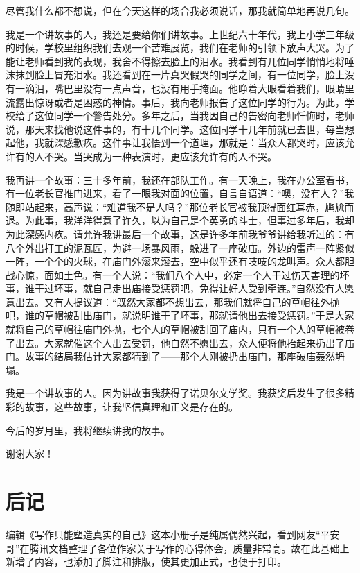 \documentclass[12pt,a5paper]{ctexbook}
\begin{document}
尽管我什么都不想说，但在今天这样的场合我必须说话，那我就简单地再说几句。

我是一个讲故事的人，我还是要给你们讲故事。上世纪六十年代，我上小学三年级的时候，学校里组织我们去观一个苦难展览，我们在老师的引领下放声大哭。为了能让老师看到我的表现，我舍不得擦去脸上的泪水。我看到有几位同学悄悄地将唾沫抹到脸上冒充泪水。我还看到在一片真哭假哭的同学之间，有一位同学，脸上没有一滴泪，嘴巴里没有一点声音，也没有用手掩面。他睁着大眼看着我们，眼睛里流露出惊讶或者是困惑的神情。事后，我向老师报告了这位同学的行为。为此，学校给了这位同学一个警告处分。多年之后，当我因自己的告密向老师忏悔时，老师说，那天来找他说这件事的，有十几个同学。这位同学十几年前就已去世，每当想起他，我就深感歉疚。这件事让我悟到一个道理，那就是：当众人都哭时，应该允许有的人不哭。当哭成为一种表演时，更应该允许有的人不哭。

我再讲一个故事：三十多年前，我还在部队工作。有一天晚上，我在办公室看书，有一位老长官推门进来，看了一眼我对面的位置，自言自语道：“噢，没有人？”我随即站起来，高声说：“难道我不是人吗？”那位老长官被我顶得面红耳赤，尴尬而退。为此事，我洋洋得意了许久，以为自己是个英勇的斗士，但事过多年后，我却为此深感内疚。请允许我讲最后一个故事，这是许多年前我爷爷讲给我听过的：有八个外出打工的泥瓦匠，为避一场暴风雨，躲进了一座破庙。外边的雷声一阵紧似一阵，一个个的火球，在庙门外滚来滚去，空中似乎还有吱吱的龙叫声。众人都胆战心惊，面如土色。有一个人说：“我们八个人中，必定一个人干过伤天害理的坏事，谁干过坏事，就自己走出庙接受惩罚吧，免得让好人受到牵连。”自然没有人愿意出去。又有人提议道：“既然大家都不想出去，那我们就将自己的草帽往外抛吧，谁的草帽被刮出庙门，就说明谁干了坏事，那就请他出去接受惩罚。”于是大家就将自己的草帽往庙门外抛，七个人的草帽被刮回了庙内，只有一个人的草帽被卷了出去。大家就催这个人出去受罚，他自然不愿出去，众人便将他抬起来扔出了庙门。故事的结局我估计大家都猜到了——那个人刚被扔出庙门，那座破庙轰然坍塌。

我是一个讲故事的人。因为讲故事我获得了诺贝尔文学奖。我获奖后发生了很多精彩的故事，这些故事，让我坚信真理和正义是存在的。

今后的岁月里，我将继续讲我的故事。

谢谢大家！

\newpage

\section{后记}

编辑《写作只能塑造真实的自己》这本小册子是纯属偶然兴起，看到网友“平安哥”在腾讯文档整理了各位作家关于写作的心得体会，质量非常高。故在此基础上新增了内容，也添加了脚注和排版，使其更加正式，也便于打印。
\end{document}
